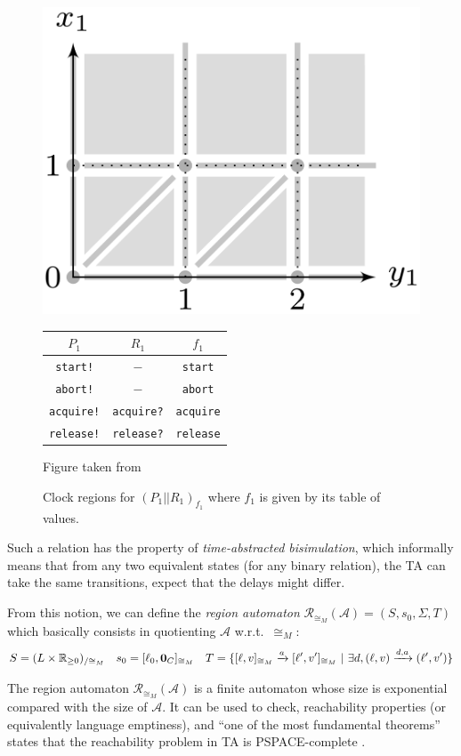 \documentclass[11pt]{article}
\theoremstyle{definition}
\theoremstyle{remark}
\theoremstyle{definition}
\newtheorem{proposition}{Proposition}
\begin{document}
\begin{figure}[ht]
	\centering
	\includegraphics[width=.25\textwidth]{../img/TAreg.png}
	\qquad
	\begin{tabular}[b]{c|c||c}\hline
	$P_1$ & $R_1$ & $f_1$\\
	\hline
	\hline
	\texttt{start!} & $-$ & \texttt{start} \\ \hline
	\texttt{abort!} & $-$ & \texttt{abort} \\ \hline
	\texttt{acquire!} & \texttt{acquire?} & \texttt{acquire} \\ \hline
	\texttt{release!} & \texttt{release?} & \texttt{release} \\ \hline
	\end{tabular}
	\caption{Clock regions for $(P_1 || R_1)_{f_1}$ where $f_1$ is given by its table of values.}\label{fig:ta_reg}
	{\tiny Figure taken from \cite[Chapter 29.3]{handbook}}
\end{figure}

Such a relation has the property of \emph{time-abstracted bisimulation}, which informally means that from any two equivalent states (for any binary  relation), the TA can take the same transitions, expect that the delays might differ.

From this notion, we can define the \emph{region automaton} $\mathcal{R}_{\cong_M}(\mathcal{A}) = (S, s_0, \Sigma, T)$ which basically consists in quotienting $\mathcal{A}$ w.r.t.\ $\cong_M$:
$$
S = (L \times \mathbb{R}_{\geq 0})_{/\cong_M} \quad
s_0 = [\ell_0, \text{\bf 0}_C]_{\cong_M} \quad
T = \{ [\ell, v]_{\cong_M} \xrightarrow{a} [\ell', v']_{\cong_M}\ | \ \exists d, (\ell, v) \xrightarrow{d, a} (\ell', v')\}
$$

The region automaton $\mathcal{R}_{\cong_M}(\mathcal{A})$ is a finite automaton whose size is exponential compared with the size of $\mathcal{A}$. It can be used to check, reachability properties (or equivalently language emptiness), and ``one of the most fundamental theorems'' \cite[Chapter 29.2, Theorem 1]{handbook} states that the reachability problem in TA is PSPACE-complete \cite[Section~4.5]{AlurDill}.

\end{document}
